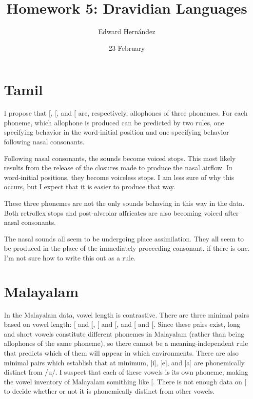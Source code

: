 \documentclass[doc,12pt]{apa6}
\begin{document}
\title{Homework 5: Dravidian Languages}
\author{Edward Hern\'{a}ndez}
\date{23 February}
\maketitle

\section{Tamil}

I propose that {[}\textipa{p b B}{]}, {[}\textipa{t d D}{]}, and {[}\textipa{k
g G}{]} are, respectively, allophones of three phonemes.  For each phoneme,
which allophone is produced can be predicted by two rules, one specifying
behavior in the word-initial position and one specifying behavior following
nasal consonants.
\begin{exe}
	\ex {}
	\ex {}
	\ex {}
	\ex {}
	\ex {}
	\ex {}
\end{exe}
Following nasal consonants, the sounds become voiced stops. This most likely
results from the release of the closures made to produce the nasal airflow.
In word-initial positions, they become voiceless stops. I am less sure of
why this occurs, but I expect that it is easier to produce that way.

These three phonemes are not the only sounds behaving in this way in the data.
Both retroflex stops and post-alveolar affricates are also becoming voiced
after nasal consonants.
\begin{exe}
	\ex {}
	\ex {}
\end{exe}

The nasal sounds all seem to be undergoing place assimilation. They all seem to
be produced in the place of the immediately proceeding consonant, if there is
one. I'm not sure how to write this out as a rule.

\section{Malayalam}

In the Malayalam data, vowel length is contrastive. There are three minimal
pairs based on vowel length: {[}\textipa{ciri}{]} and {[}\textipa{ci:ri}{]},
{[}\textipa{ke{\textrtailt}:u}{]} and {[}\textipa{ke:{\textrtailt}:u}{]}, and
{[}\textipa{ka{\textrtailt}i}{]} and {[}\textipa{ka{\textrtailt}i}{]}. Since
these pairs exist, long and short vowels constitute different phonemes in
Malayalam (rather than being allophones of the same phoneme), so there cannot
be a meaning-independent rule that predicts which of them will appear in which
environments. There are also minimal pairs which establish that at minimum,
{[}i{]}, {[}e{]}, and {[}a{]} are phonemically distinct from /u/. I suspect
that each of these vowels is its own phoneme, making the vowel inventory of
Malayalam somithing like {[}\textipa{i u e e: a a:}{]}. There is not enough
data on {[}\textipa{@}{]} to decide whether or not it is phonemically distinct
from other vowels.
\end{document}
